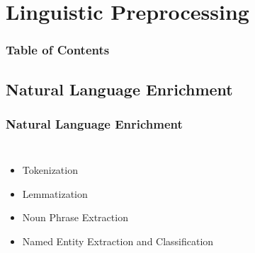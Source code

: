 \documentclass[red]{beamer}
\begin{document}
\section{Linguistic Preprocessing}
\begin{frame}
\frametitle{Table of Contents}
\tableofcontents[currentsection]
\end{frame}
\subsection{Natural Language Enrichment}
\begin{frame}
    \frametitle{Natural Language Enrichment}
    \begin{columns}
            \begin{itemize}
                \item
                    Tokenization
                \item
                    Lemmatization
                \item
                    Noun Phrase Extraction
                \item
                    Named Entity Extraction and Classification
            \end{itemize}
        \begin{figure}

\end{figure}
\end{columns}
\end{frame}
\end{document}
